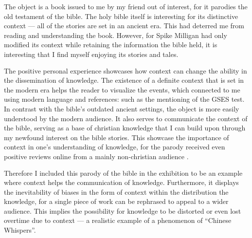 \documentclass[a4paper,11pt]{article}
\begin{document}
The object is a book issued to me by my friend out of interest, for it parodies the old testament of the bible. The holy bible itself is interesting for its distinctive context
--- all of the stories are set in an ancient era. This had deterred me from reading and understanding the book. However, for Spike Milligan had only modified its context while retaining the information the bible held, it is interesting that I find myself enjoying its stories and tales.

The positive personal experience showcases how context can change the ability in the dissemination of knowledge. The existence of a definite context that is set in the modern era helps the reader to visualize the events, which connected to me using modern language and references: such as the mentioning of the GSES test. In contrast with the bible's outdated ancient settings, the object is more easily understood by the modern audience. It also serves to communicate the context of the bible, serving as a base of christian knowledge that I can build upon through my newfound interest on the bible stories. This showcase the importance of context in one's understanding of knowledge, for the parody received even positive reviews online from a mainly non-christian audience \parencite{Review}.




Therefore I included this parody of the bible in the exhibition to be an example where context helps the communication of knowledge. Furthermore, it displays the inevitability of biases in the form of context within the distribution the knowledge, for a single piece of work can be rephrased to appeal to a wider audience. This implies the possibility for knowledge to be distorted or even lost overtime due to context --- a realistic example of a phenomenon of ``Chinese Whispers''.
\end{document}
